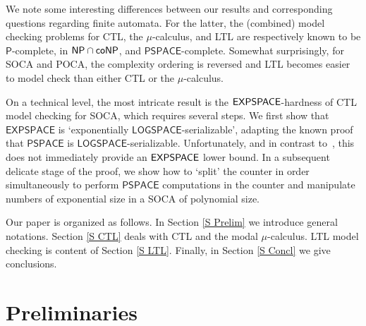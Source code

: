 \documentclass[times,envcountsame]{llncs}
\def\PSPACE{{\mathsf{PSPACE}}}
\begin{document}
We note some interesting differences between our results and
corresponding questions regarding finite automata. For the latter, the
(combined) model checking problems for CTL, the $\mu$-calculus, and
LTL are respectively known to be $\mathsf{P}$-complete, in
$\mathsf{NP} \cap {\ensuremath{\mathsf{coNP}}}$, and $\PSPACE$-complete. Somewhat
surprisingly, for SOCA and POCA, the complexity ordering is reversed
and LTL becomes easier to model check than either CTL or the
$\mu$-calculus.

On a technical level, the most intricate result is the
${\mathsf{EXPSPACE}}$-hardness of CTL model checking for SOCA, which requires
several steps. We first show that $\mathsf{EXPSPACE}$ is `exponentially
$\mathsf{LOGSPACE}$-serializable', adapting the known proof that
$\PSPACE$ is $\mathsf{LOGSPACE}$-serializable. Unfortunately, and in
contrast to~\cite{GoLo10}, this does not immediately provide
an ${\mathsf{EXPSPACE}}$ lower bound. In a subsequent delicate stage of the
proof, we show how to `split' the counter in order simultaneously to
perform $\PSPACE$ computations in the counter and manipulate numbers
of exponential size in a SOCA of polynomial size.



Our paper is organized as follows. In Section \ref{S Prelim} we
introduce general notations.
Section \ref{S CTL} deals with CTL and the modal $\mu$-calculus.
LTL model checking is content of Section \ref{S LTL}.
Finally, in Section \ref{S Concl} we give conclusions.

\section{Preliminaries}{\label{S Prelim}}

\newcommand{\N}{\mathbb{N}}
\newcommand{\Z}{\mathbb{Z}}
\renewcommand{\O}{\mathbb{O}}

\newcommand{\trans}[1]{\stackrel{#1}{\longrightarrow}}
\newcommand{\hook}[1]{\stackrel{#1}{\hookrightarrow}}
\renewcommand{\rule}[2]{\stackrel{#2}{\stackrel{#1}{\longrightarrow}}}

\renewcommand{\M}{\mathcal{M}}

\newcommand{\bit}{\text{bit}}
\renewcommand{\succ}{\text{succ}}

\newcommand{\Reach}{\text{Reach}}
\newcommand{\Moves}{\text{Moves}}
\newcommand{\bin}{\text{bin}}
\end{document}
